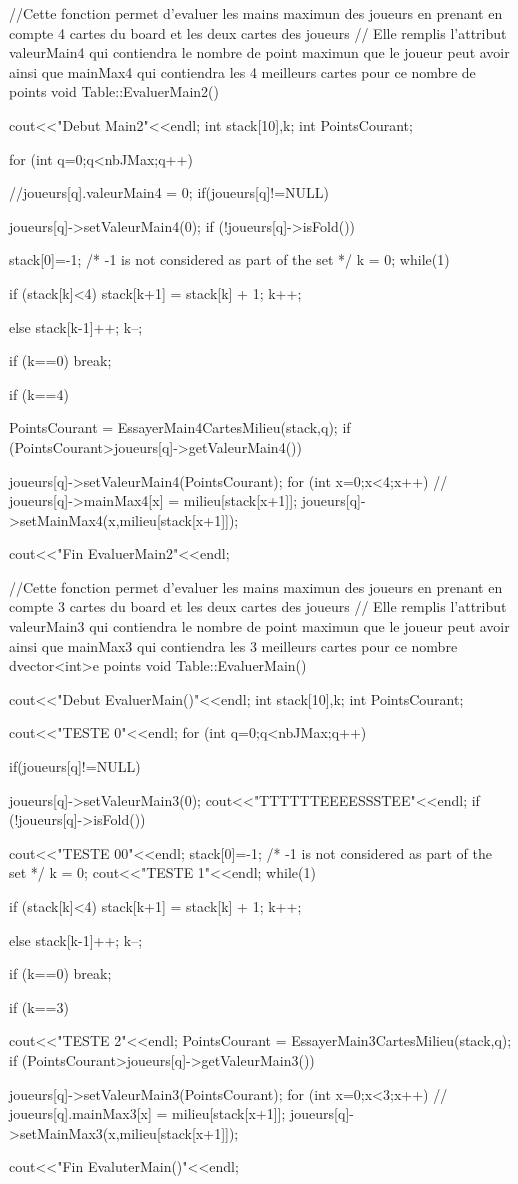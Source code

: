 \documentclass{article}
\begin{document}
//Cette fonction permet d'evaluer les mains maximun des joueurs en prenant en compte 4 cartes du board et les deux cartes des joueurs
// Elle remplis l'attribut valeurMain4 qui contiendra le nombre de point maximun que le joueur peut avoir ainsi que mainMax4 qui contiendra les 4 meilleurs cartes pour ce nombre de points
void Table::EvaluerMain2()
{
  cout<<"Debut Main2"<<endl;
  int stack[10],k;
  int PointsCourant;
  
  for (int q=0;q<nbJMax;q++){
    //joueurs[q].valeurMain4 = 0;
    if(joueurs[q]!=NULL){
      joueurs[q]->setValeurMain4(0);
      if (!joueurs[q]->isFold()){
	stack[0]=-1; /* -1 is not considered as part of the set */
	k = 0;
	while(1){
	  if (stack[k]<4){
	    stack[k+1] = stack[k] + 1;
	    k++;
	  }
	  
	  else{
	    stack[k-1]++;
	    k--;
	  }
	  
	  if (k==0)
	    break;

	  if (k==4){
	    PointsCourant = EssayerMain4CartesMilieu(stack,q);
	    if (PointsCourant>joueurs[q]->getValeurMain4()){
	      joueurs[q]->setValeurMain4(PointsCourant);
	      for (int x=0;x<4;x++){
		//   joueurs[q]->mainMax4[x] = milieu[stack[x+1]];
		joueurs[q]->setMainMax4(x,milieu[stack[x+1]]);
	      }
	      
	      
	    }
	  }
	  
	}
      }
    }
  }
  cout<<"Fin EvaluerMain2"<<endl;
}



//Cette fonction permet d'evaluer les mains maximun des joueurs en prenant en compte 3 cartes du board et les deux cartes des joueurs
// Elle remplis l'attribut valeurMain3 qui contiendra le nombre de point maximun que le joueur peut avoir ainsi que mainMax3 qui contiendra les 3 meilleurs cartes pour ce nombre dvector<int>e points
void Table::EvaluerMain()
{
  cout<<"Debut EvaluerMain()"<<endl;
  int stack[10],k;
  int PointsCourant;
  
  cout<<"TESTE 0"<<endl;
  for (int q=0;q<nbJMax;q++){
    if(joueurs[q]!=NULL){
      joueurs[q]->setValeurMain3(0);
      cout<<"TTTTTTEEEESSSTEE"<<endl;
      if (!joueurs[q]->isFold()){
	cout<<"TESTE 00"<<endl;
	stack[0]=-1; /* -1 is not considered as part of the set */
	k = 0;
	cout<<"TESTE 1"<<endl;
	while(1){
	  if (stack[k]<4){
	    stack[k+1] = stack[k] + 1;
	    k++;
	  }
	  
	  else{
	    stack[k-1]++;
	    k--;
	  }
	  
	  if (k==0)
	    break;
	  
	  if (k==3){
	    cout<<"TESTE 2"<<endl;
	    PointsCourant = EssayerMain3CartesMilieu(stack,q);
	    if (PointsCourant>joueurs[q]->getValeurMain3()){
	      joueurs[q]->setValeurMain3(PointsCourant);
	      for (int x=0;x<3;x++){
		//  joueurs[q].mainMax3[x] = milieu[stack[x+1]];
		joueurs[q]->setMainMax3(x,milieu[stack[x+1]]);
	      }
			    
	    }
	  }
	  
	}
      }
      
    }
  }
  cout<<"Fin EvaluterMain()"<<endl;
}
\end{document}
